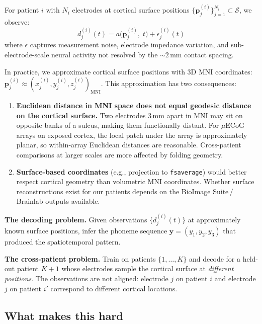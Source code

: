 \documentclass[11pt,letterpaper]{article}
\newcommand{\bfp}{\mathbf{p}}
\newcommand{\bfy}{\mathbf{y}}
\newcommand{\cS}{\mathcal{S}}
\begin{document}
For patient $i$ with $N_i$ electrodes at cortical surface positions $\{\bfp_j^{(i)}\}_{j=1}^{N_i} \subset \cS$, we observe:
\begin{equation}\label{eq:observation}
d_j^{(i)}(t) = a\bigl(\bfp_j^{(i)},\; t\bigr) + \epsilon_j^{(i)}(t)
\end{equation}
where $\epsilon$ captures measurement noise, electrode impedance variation, and sub-electrode-scale neural activity not resolved by the ${\sim}2$\,mm contact spacing.

In practice, we approximate cortical surface positions with 3D MNI coordinates: $\bfp_j^{(i)} \approx (x_j^{(i)}, y_j^{(i)}, z_j^{(i)})_{\text{MNI}}$. This approximation has two consequences:

\begin{enumerate}[leftmargin=2em]
\item \textbf{Euclidean distance in MNI space does not equal geodesic distance on the cortical surface.} Two electrodes 3\,mm apart in MNI may sit on opposite banks of a sulcus, making them functionally distant. For $\mu$ECoG arrays on exposed cortex, the local patch under the array is approximately planar, so within-array Euclidean distances are reasonable. Cross-patient comparisons at larger scales are more affected by folding geometry.

\item \textbf{Surface-based coordinates} (e.g., projection to \texttt{fsaverage}) would better respect cortical geometry than volumetric MNI coordinates. Whether surface reconstructions exist for our patients depends on the BioImage Suite\,/\,Brainlab outputs available.
\end{enumerate}

\textbf{The decoding problem.} Given observations $\{d_j^{(i)}(t)\}$ at approximately known surface positions, infer the phoneme sequence $\bfy = (y_1, y_2, y_3)$ that produced the spatiotemporal pattern.

\textbf{The cross-patient problem.} Train on patients $\{1, \ldots, K\}$ and decode for a held-out patient $K{+}1$ whose electrodes sample the cortical surface at \emph{different positions}. The observations are not aligned: electrode $j$ on patient $i$ and electrode $j$ on patient $i'$ correspond to different cortical locations.

\subsection{What makes this hard}
\end{document}
